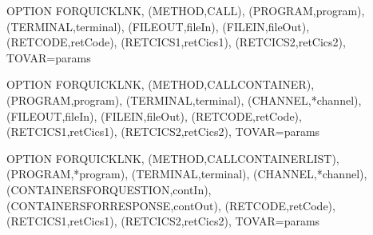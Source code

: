 \documentclass[letterpaper,10pt,english]{sphinxmanual}
\begin{document}
\begin{sphinxVerbatim}[commandchars=\\\{\}]
OPTION\PYGZdl{} FOR\PYGZhy{}QUICKLNK,
    (METHOD,\PYGZsq{}CALL\PYGZsq{}),
    (PROGRAM,\PYGZsq{}program\PYGZsq{}),
    (TERMINAL,\PYGZsq{}terminal\PYGZsq{}),
    (FILE\PYGZhy{}OUT,\PYGZsq{}fileIn\PYGZsq{}),
    (FILE\PYGZhy{}IN,\PYGZsq{}fileOut\PYGZsq{}),
    (RET\PYGZhy{}CODE,\PYGZsq{}retCode\PYGZsq{}),
    (RET\PYGZhy{}CICS1,\PYGZsq{}retCics1\PYGZsq{}),
    (RET\PYGZhy{}CICS2,\PYGZsq{}retCics2\PYGZsq{}),
    TOVAR=\PYGZsq{}params\PYGZsq{}

OPTION\PYGZdl{} FOR\PYGZhy{}QUICKLNK,
    (METHOD,\PYGZsq{}CALL\PYGZhy{}CONTAINER\PYGZsq{}),
    (PROGRAM,\PYGZsq{}program\PYGZsq{}),
    (TERMINAL,\PYGZsq{}terminal\PYGZsq{}),
    (CHANNEL,\PYGZsq{}*channel\PYGZsq{}),
    (FILE\PYGZhy{}OUT,\PYGZsq{}fileIn\PYGZsq{}),
    (FILE\PYGZhy{}IN,\PYGZsq{}fileOut\PYGZsq{}),
    (RET\PYGZhy{}CODE,\PYGZsq{}retCode\PYGZsq{}),
    (RET\PYGZhy{}CICS1,\PYGZsq{}retCics1\PYGZsq{}),
    (RET\PYGZhy{}CICS2,\PYGZsq{}retCics2\PYGZsq{}),
    TOVAR=\PYGZsq{}params\PYGZsq{}

OPTION\PYGZdl{} FOR\PYGZhy{}QUICKLNK,
    (METHOD,\PYGZsq{}CALL\PYGZhy{}CONTAINER\PYGZhy{}LIST\PYGZsq{}),
    (PROGRAM,\PYGZsq{}*program\PYGZsq{}),
    (TERMINAL,\PYGZsq{}terminal\PYGZsq{}),
    (CHANNEL,\PYGZsq{}*channel\PYGZsq{}),
    (CONTAINERS\PYGZhy{}FOR\PYGZhy{}QUESTION,\PYGZsq{}contIn\PYGZsq{}),
    (CONTAINERS\PYGZhy{}FOR\PYGZhy{}RESPONSE,\PYGZsq{}contOut\PYGZsq{}),
    (RET\PYGZhy{}CODE,\PYGZsq{}retCode\PYGZsq{}),
    (RET\PYGZhy{}CICS1,\PYGZsq{}retCics1\PYGZsq{}),
    (RET\PYGZhy{}CICS2,\PYGZsq{}retCics2\PYGZsq{}),
    TOVAR=\PYGZsq{}params\PYGZsq{}
\end{sphinxVerbatim}
\end{document}
